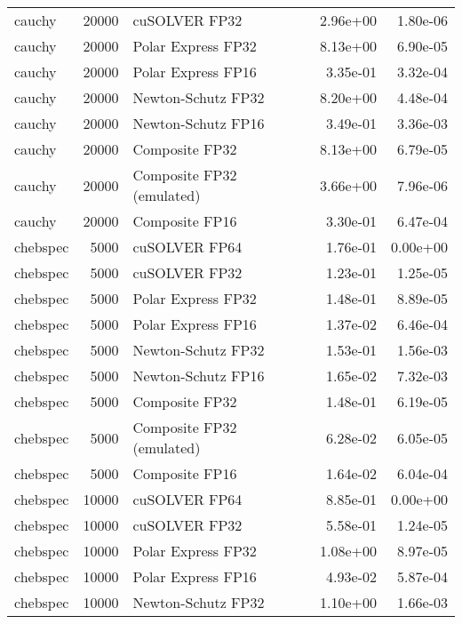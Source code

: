 \begin{table}
\begin{tabular}{lrlrr}
   cauchy & 20000 &             cuSOLVER FP32 &  2.96e+00 &        1.80e-06 \\
   cauchy & 20000 &        Polar Express FP32 &  8.13e+00 &        6.90e-05 \\
   cauchy & 20000 &        Polar Express FP16 &  3.35e-01 &        3.32e-04 \\
   cauchy & 20000 &        Newton-Schutz FP32 &  8.20e+00 &        4.48e-04 \\
   cauchy & 20000 &        Newton-Schutz FP16 &  3.49e-01 &        3.36e-03 \\
   cauchy & 20000 &            Composite FP32 &  8.13e+00 &        6.79e-05 \\
   cauchy & 20000 & Composite FP32 (emulated) &  3.66e+00 &        7.96e-06 \\
   cauchy & 20000 &            Composite FP16 &  3.30e-01 &        6.47e-04 \\
 chebspec &  5000 &             cuSOLVER FP64 &  1.76e-01 &        0.00e+00 \\
 chebspec &  5000 &             cuSOLVER FP32 &  1.23e-01 &        1.25e-05 \\
 chebspec &  5000 &        Polar Express FP32 &  1.48e-01 &        8.89e-05 \\
 chebspec &  5000 &        Polar Express FP16 &  1.37e-02 &        6.46e-04 \\
 chebspec &  5000 &        Newton-Schutz FP32 &  1.53e-01 &        1.56e-03 \\
 chebspec &  5000 &        Newton-Schutz FP16 &  1.65e-02 &        7.32e-03 \\
 chebspec &  5000 &            Composite FP32 &  1.48e-01 &        6.19e-05 \\
 chebspec &  5000 & Composite FP32 (emulated) &  6.28e-02 &        6.05e-05 \\
 chebspec &  5000 &            Composite FP16 &  1.64e-02 &        6.04e-04 \\
 chebspec & 10000 &             cuSOLVER FP64 &  8.85e-01 &        0.00e+00 \\
 chebspec & 10000 &             cuSOLVER FP32 &  5.58e-01 &        1.24e-05 \\
 chebspec & 10000 &        Polar Express FP32 &  1.08e+00 &        8.97e-05 \\
 chebspec & 10000 &        Polar Express FP16 &  4.93e-02 &        5.87e-04 \\
 chebspec & 10000 &        Newton-Schutz FP32 &  1.10e+00 &        1.66e-03 \\

\end{tabular}
\end{table}
